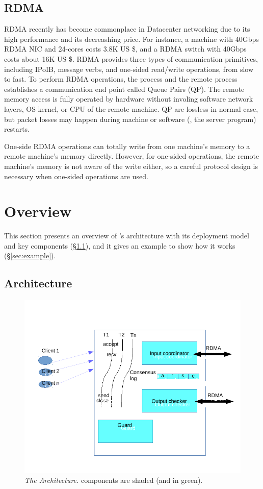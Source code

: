 \subsection{RDMA}\label{sec:rdma}
RDMA recently has become commonplace in Datacenter networking due to its high 
performance and its decreashing price. For instance, a machine with 40Gbps RDMA 
NIC and 24-cores costs 3.8K US \$, and a RDMA switch with 40Gbps costs about 
16K US \$. RDMA provides three types of communication primitives, including 
IPoIB, message verbs, and one-sided read/write operations, from slow to fast. To 
perform RDMA operations, the process and the remote process establishes a 
communication end point called Queue Pairs (QP). The remote memory access is 
fully operated by hardware without involing software network layers, OS kernel, 
or CPU of the remote machine. QP are lossless in normal case, but packet losses 
may happen during machine or software (\eg, the server program) restarts.

One-side RDMA operations can totally write from one machine's memory to a 
remote machine's memory directly. However, for one-sided operations, the remote 
machine's memory is not aware of the write either, so a careful protocol design 
is necessary when one-sided operations are used.


\section{\xxx Overview}\label{sec:overview}

This section presents an overview of \xxx's architecture with its deployment 
model and key components (\S\ref{sec:arch}), and it gives an example to show 
how it works (\S\ref{sec:example}).

\subsection{Architecture}\label{sec:arch}

\begin{figure}[t]
\centering
\includegraphics[width=.5\textwidth]{figures/arch}
\vspace{-.20in}
\caption{{\em The \xxx Architecture.} \xxx components are shaded (and in
  green).} \label{fig:arch}
\vspace{-.05in}
\end{figure}

